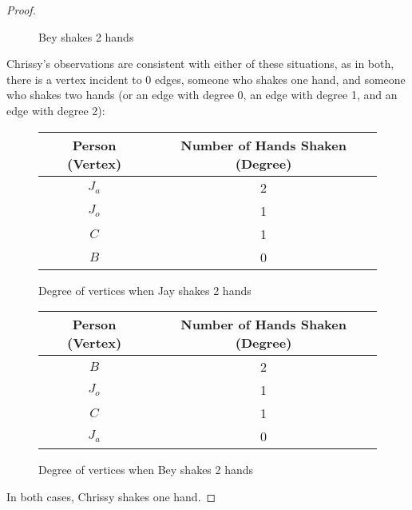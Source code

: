 \documentclass[article, 12pt]{article}
\theoremstyle{definition}
\begin{document}
\begin{proof}
\begin{figure}[H]
\begin{minipage}[t]{.4\textwidth}
                \caption{Bey shakes 2 hands}
            \end{minipage}
        \end{figure}
        Chrissy's observations are consistent with either of these situations, as in both, there is a vertex incident to 0 edges, someone who shakes one hand, and someone who shakes two hands (or an edge with degree 0, an edge with degree 1, and an edge with degree 2):
        \begin{figure}[H]
            \centering
                \begin{tabular}{|c|c|}
                    \hline
                    Person (Vertex) & Number of Hands Shaken (Degree) \\
                    \hline
                    $J_a$ & 2 \\
                    $J_o$ & 1 \\
                    $C$ & 1 \\
                    $B$ & 0 \\
                    \hline
                \end{tabular}
                \caption{Degree of vertices when Jay shakes 2 hands}
        \end{figure}
        \begin{figure}[H]
            \centering
                \begin{tabular}{|c|c|}
                    \hline
                    Person (Vertex) & Number of Hands Shaken (Degree) \\
                    \hline
                    $B$ & 2 \\
                    $J_o$ & 1 \\
                    $C$ & 1 \\
                    $J_a$ & 0 \\
                    \hline
                \end{tabular}
                \caption{Degree of vertices when Bey shakes 2 hands}
        \end{figure}
        In both cases, Chrissy shakes one hand.
    \end{proof}
\end{document}
